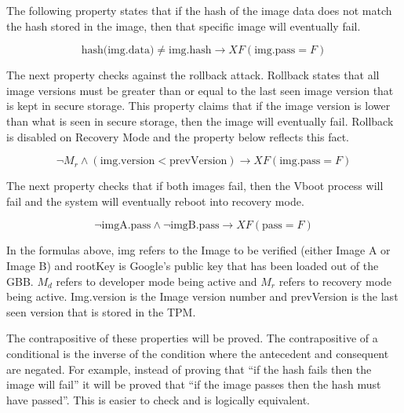 The following property states that if the hash of the image data does not match the hash stored in the image, then that specific image will eventually fail.

\begin{equation} \label{eq:hash_cor}
    \text{hash(img.data)} \neq \text{img.hash} \to XF (\text{img.pass} = F)
\end{equation}

The next property checks against the rollback attack. 
Rollback states that all image versions must be greater than or equal to the last seen image version that is kept in secure storage. 
This property claims that if the image version is lower than what is seen in secure storage, then the image will eventually fail.
Rollback is disabled on Recovery Mode and the property below reflects this fact.

\begin{equation} \label{eq:rollback}
    \lnot M_r \land (\text{img.version} < \text{prevVersion}) \to XF (\text{img.pass} = F)
\end{equation}

The next property checks that if both images fail, then the Vboot process will fail and the system will eventually reboot into recovery mode.

\begin{equation} \label{eq:both-fail}
    \lnot \text{imgA.pass} \land \lnot \text{imgB.pass} \to XF (\text{pass} = F)
\end{equation}



In the formulas above, img refers to the Image to be verified (either Image A or Image B)  and rootKey is Google's public key that has been loaded out of the GBB.
$M_d$ refers to developer mode being active and $M_r$ refers to recovery mode being active.
Img.version is the Image version number and prevVersion is the last seen version that is stored in the TPM\@.

The contrapositive of these properties will be proved.
The contrapositive of a conditional is the inverse of the condition where the antecedent and consequent are negated.
For example, instead of proving that ``if the hash fails then the image will fail'' it will be proved that ``if the image passes then the hash must have passed''. 
This is easier to check and is logically equivalent.


